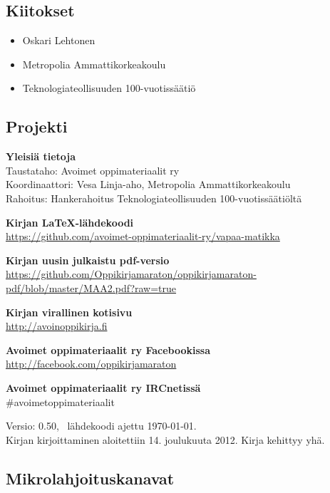 \subsection*{Kiitokset}
\begin{itemize}
\item Oskari Lehtonen %
\item Metropolia Ammattikorkeakoulu %
\item Teknologiateollisuuden 100-vuotissäätiö %
\end{itemize}



\newpage
\subsection*{Projekti}

\textbf{Yleisiä tietoja} \\
Taustataho: Avoimet oppimateriaalit ry \\
Koordinaattori: Vesa Linja-aho, Metropolia Ammattikorkeakoulu \\
Rahoitus: Hankerahoitus Teknologiateollisuuden 100-vuotissäätiöltä

\textbf{Kirjan LaTeX-lähdekoodi} \\
\url{https://github.com/avoimet-oppimateriaalit-ry/vapaa-matikka}

\textbf{Kirjan uusin julkaistu pdf-versio} \\
\url{https://github.com/Oppikirjamaraton/oppikirjamaraton-pdf/blob/master/MAA2.pdf?raw=true}

\textbf{Kirjan virallinen kotisivu} \\
\url{http://avoinoppikirja.fi}

\textbf{Avoimet oppimateriaalit ry Facebookissa} \\
\url{http://facebook.com/oppikirjamaraton}

\textbf{Avoimet oppimateriaalit ry IRCnetissä} \\
\#avoimetoppimateriaalit

Versio: 0.50, \, lähdekoodi ajettu \today. \\
Kirjan kirjoittaminen aloitettiin 14. joulukuuta 2012. Kirja kehittyy yhä.

\subsection*{Mikrolahjoituskanavat}



